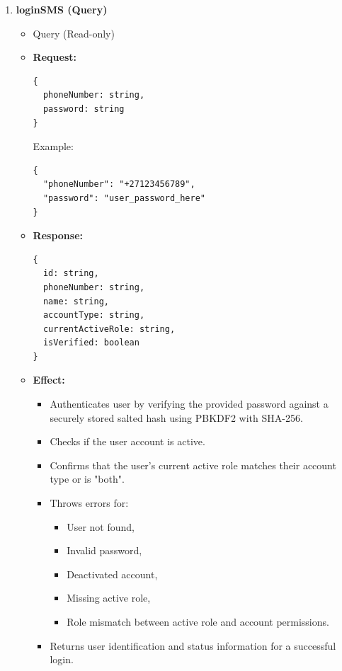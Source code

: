 \documentclass[a4paper,12pt]{article}
\begin{document}
\begin{enumerate}
\item \textbf{loginSMS (Query)}
    \begin{itemize}
      \item Query (Read-only)
      \item \textbf{Request:}
      \begin{verbatim}
{
  phoneNumber: string,
  password: string
}
      \end{verbatim}
      Example:
      \begin{verbatim}
{
  "phoneNumber": "+27123456789",
  "password": "user_password_here"
}
      \end{verbatim}
      \item \textbf{Response:}
      \begin{verbatim}
{
  id: string,
  phoneNumber: string,
  name: string,
  accountType: string,
  currentActiveRole: string,
  isVerified: boolean
}
      \end{verbatim}
      \item \textbf{Effect:}
      \begin{itemize}
        \item Authenticates user by verifying the provided password against a securely stored salted hash using PBKDF2 with SHA-256.
        \item Checks if the user account is active.
        \item Confirms that the user's current active role matches their account type or is "both".
        \item Throws errors for:
          \begin{itemize}
            \item User not found,
            \item Invalid password,
            \item Deactivated account,
            \item Missing active role,
            \item Role mismatch between active role and account permissions.
          \end{itemize}
        \item Returns user identification and status information for a successful login.
      \end{itemize}
    \end{itemize}


\end{enumerate}
\end{document}
